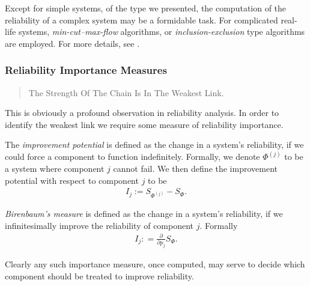 \begin{extra}
Except for simple systems, of the type we presented, the computation of the reliability of a complex system may be a formidable task. 
For complicated real-life systems, \emph{min-cut--max-flow} algorithms, or \emph{inclusion-exclusion} type algorithms are employed. 
For more details, see \cite{aven_stochastic_1999}.
\end{extra}









\subsubsection{Reliability Importance Measures}
\begin{quotation}
The Strength Of The Chain Is In The Weakest Link.
\end{quotation}
This is obviously a profound observation in reliability analysis.
In order to identify the weakest link we require some measure of reliability importance.


\begin{definition}
The \emph{improvement potential} is defined as the change in a system's reliability, if we could force a component to function indefinitely.
Formally, we denote $\Phi^{(j)}$ to be a system where component $j$ cannot fail. 
We then define the improvement potential with respect to component $j$ to be 
\begin{align}
	I_j :=S_{\Phi^{(j)}}-S_{\Phi}.
\end{align}
\end{definition}



\begin{definition}
\emph{Birenbaum's measure} is defined as the change in a system's reliability, if we infinitesimally improve the reliability of component $j$.
Formally 
\begin{align}
	I_j: =\frac{\partial}{\partial p_j} S_{\Phi}.
\end{align}
\end{definition}


Clearly any such importance measure, once computed, may serve to decide which component should be treated to improve reliability.







